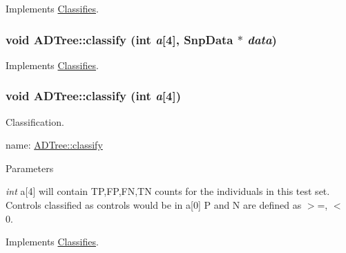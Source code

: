 Implements \hyperlink{classClassifies_a5e3d218b44024ec2c3ab3398e3dbd2e3}{Classifies}.

\hypertarget{classADTree_a498b7a7830dba60118e89d5f5bb7cbd3}{
\subsubsection[{classify}]{\setlength{\rightskip}{0pt plus 5cm}void ADTree::classify (int {\em a}\mbox{[}4\mbox{]}, \/  {\bf SnpData} $\ast$ {\em data})}}
\label{classADTree_a498b7a7830dba60118e89d5f5bb7cbd3}


Implements \hyperlink{classClassifies_a7d2ae89f04af1a74eb6dd35be8eda476}{Classifies}.

\hypertarget{classADTree_a335cdf83f845638ae6c74fa1d7e7e4b8}{
\subsubsection[{classify}]{\setlength{\rightskip}{0pt plus 5cm}void ADTree::classify (int {\em a}\mbox{[}4\mbox{]})}}
\label{classADTree_a335cdf83f845638ae6c74fa1d7e7e4b8}


Classification. 

name: \hyperlink{classADTree_a335cdf83f845638ae6c74fa1d7e7e4b8}{ADTree::classify} 
\begin{DoxyParams}{Parameters}
\item[{\em int}]a\mbox{[}4\mbox{]} will contain TP,FP,FN,TN counts for the individuals in this test set. Controls classified as controls would be in a\mbox{[}0\mbox{]} P and N are defined as $>$=, $<$ 0. \end{DoxyParams}


Implements \hyperlink{classClassifies_a15864d3a95edfde2bf48384c9b25c6d8}{Classifies}.

